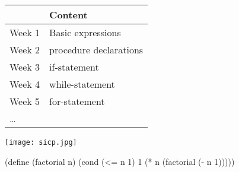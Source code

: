 \begin{frame}
\centering
\begin{tabular}{|l|l|}
\hline
       & Content \\
\hline\hline
Week 1 & Basic expressions  \\
\hline
Week 2 & procedure declarations \\
\hline
Week 3 & if-statement \\
\hline
Week 4 & while-statement \\
\hline
Week 5 & for-statement \\
\hline
\ldots & \\
\end{tabular}
\end{frame}


\begin{frame}
\centering
\texttt{[image: sicp.jpg]}
\end{frame}


\begin{frame}[fragile]
\begin{schemecode}
(define (factorial n)
  (cond (<= n 1)
        1
        (* n (factorial (- n 1)))))
\end{schemecode}
\end{frame}


\iffalse
\begin{frame}[fragile]
\begin{schemecode}
(define (map proc items)
  (cond (null? items)
      nil
      (cons (proc (car items))
            (map proc (cdr items)))))
\end{schemecode}
\end{frame}


\begin{frame}[fragile]
\begin{schemecode}
(define (abs x)
  (cond ((> x 0) x)
        ((= x 0) x)
        ((< x 0) (- x))))
\end{schemecode}
\end{frame}
\fi


